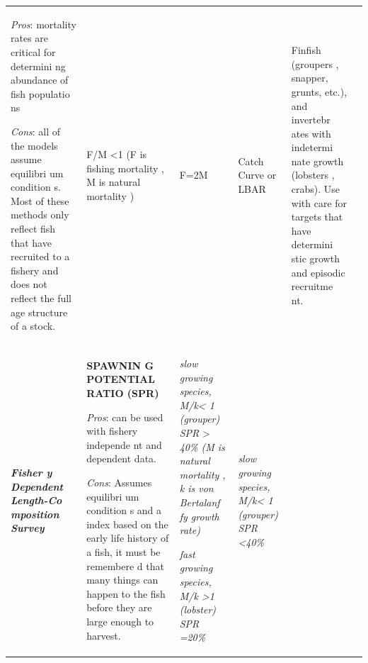 \documentclass[]{book}
\begin{document}
\begin{longtable}[]{@{}llllll@{}}
\begin{minipage}[t]{0.16\columnwidth}
\emph{Pros}: mortality rates are critical for determini ng abundance of
fish populatio ns

\emph{Cons}: all of the models assume equilibri um condition s. Most of
these methods only reflect fish that have recruited to a fishery and
does not reflect the full age structure of a stock.\strut
\end{minipage} & \begin{minipage}[t]{0.16\columnwidth}\raggedright\strut
F/M \textless{}1 (F is fishing mortality , M is natural mortality
)\strut
\end{minipage} & \begin{minipage}[t]{0.16\columnwidth}\raggedright\strut
F=2M\strut
\end{minipage} & \begin{minipage}[t]{0.16\columnwidth}\raggedright\strut
Catch Curve or LBAR\strut
\end{minipage} & \begin{minipage}[t]{0.16\columnwidth}\raggedright\strut
Finfish (groupers , snapper, grunts, etc.), and invertebr ates with
indetermi nate growth (lobsters , crabs). Use with care for targets that
have determini stic growth and episodic recruitme nt.\strut
\end{minipage}\tabularnewline
\begin{minipage}[t]{0.16\columnwidth}\raggedright\strut
\textbf{\emph{Fisher y Dependent Length-Co mposition Survey}}\strut
\end{minipage} & \begin{minipage}[t]{0.16\columnwidth}\raggedright\strut
\textbf{SPAWNIN G POTENTIAL RATIO (SPR)}

\emph{Pros}: can be used with fishery independe nt and dependent data.

\emph{Cons}: Assumes equilibri um condition s and a index based on the
early life history of a fish, it must be remembere d that many things
can happen to the fish before they are large enough to harvest.\strut
\end{minipage} & \begin{minipage}[t]{0.16\columnwidth}\raggedright\strut
\emph{slow growing species, M/k\textless{} 1 (grouper) SPR
}\textgreater{}\emph{ 40\% (M is natural mortality , k is von Bertalanf
fy growth rate)}

\emph{fast growing species, M/k \textgreater{}1 (lobster) SPR
=20\%}\strut
\end{minipage} & \begin{minipage}[t]{0.16\columnwidth}\raggedright\strut
\emph{slow growing species, M/k\textless{} 1 (grouper) SPR
\textless{}40\%}


\end{minipage}
\end{longtable}
\end{document}
